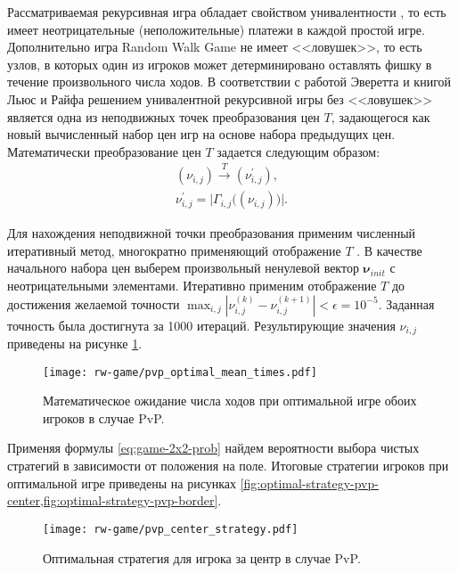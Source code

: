 Рассматриваемая рекурсивная игра обладает свойством унивалентности \cite{everett_recursive_1958}, то есть имеет неотрицательные (неположительные) платежи в каждой простой игре. Дополнительно игра Random Walk Game не имеет <<ловушек>>, то есть узлов, в которых один из игроков может детерминировано оставлять фишку в течение произвольного числа ходов. В соответствии с работой Эверетта \cite{everett_recursive_1958} и книгой Льюс и Райфа \cite{luce_games_1957a} решением унивалентной рекурсивной игры без <<ловушек>> является одна из неподвижных точек преобразования цен $T$, задающегося как новый вычисленный набор цен игр на основе набора предыдущих цен. Математически преобразование цен $T$ задается следующим образом:
\begin{equation}
    \begin{aligned}
        (\nu_{i,j}) \xrightarrow{T} (\nu_{i,j}^\prime), \\
        \nu_{i,j}^\prime = \big |\Gamma_{i,j} \big(\left (\nu_{i,j} \right ) \big)\big |.
    \end{aligned}
\end{equation}

Для нахождения неподвижной точки преобразования применим численный итеративный метод, многократно применяющий отображение $T$ \cite{everett_recursive_1958}. В качестве начального набора цен выберем произвольный ненулевой вектор $\boldsymbol{\nu}_{init}$ с неотрицательными элементами. 
Итеративно применим отображение $T$ до достижения желаемой точности $\max_{i,j}\left |\nu_{i,j}^{(k)}-\nu_{i,j}^{(k+1)}\right |<\epsilon=10^{-5}$. Заданная точность была достигнута за 1000 итераций. Результирующие значения $\nu_{i,j}$ приведены на рисунке \cref{fig:optimal-value-pvp}.

\begin{figure}[t]
    \centering
    \texttt{[image: rw-game/pvp\_optimal\_mean\_times.pdf]}
    \caption{
        Математическое ожидание числа ходов при оптимальной игре обоих игроков в случае PvP.
    }  
    \label{fig:optimal-value-pvp}
\end{figure}

Применяя формулы \cref{eq:game-2x2-prob} найдем вероятности выбора чистых стратегий в зависимости от положения на поле. Итоговые стратегии игроков при оптимальной игре приведены на рисунках \cref{fig:optimal-strategy-pvp-center,fig:optimal-strategy-pvp-border}. 

\begin{figure}[t]
    \centering
    \texttt{[image: rw-game/pvp\_center\_strategy.pdf]}
    \caption{
        Оптимальная стратегия для игрока за центр в случае PvP.
    }  
    \label{fig:optimal-strategy-pvp-center}
    
\end{figure}

